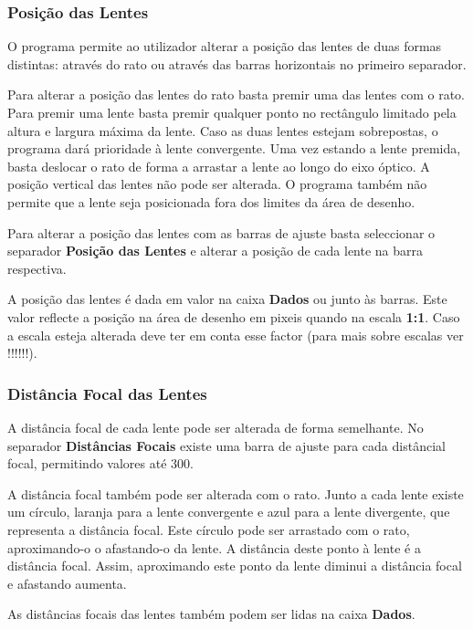 \documentclass[a4paper,12pt]{article}
\begin{document}
\subsubsection{Posição das Lentes}
O programa permite ao utilizador alterar a posição das lentes de duas formas distintas: através do rato ou através das barras horizontais no primeiro separador.
\par
Para alterar a posição das lentes do rato basta premir uma das lentes com o rato. Para premir uma lente basta premir qualquer ponto no rectângulo limitado pela altura e largura máxima da lente. Caso as duas lentes estejam sobrepostas, o programa dará prioridade à lente convergente. Uma vez estando a lente premida, basta deslocar o rato de forma a arrastar a lente ao longo do eixo óptico. A posição vertical das lentes não pode ser alterada. O programa também não permite que a lente seja posicionada fora dos limites da área de desenho.
\par
Para alterar a posição das lentes com as barras de ajuste basta seleccionar o separador {\bf Posição das Lentes} e alterar a posição de cada lente na barra respectiva.
\par 
A posição das lentes é dada em valor na caixa {\bf Dados} ou junto às barras. Este valor reflecte a posição na área de desenho em pixeis quando na escala {\bf 1:1}. Caso a escala esteja alterada deve ter em conta esse factor (para mais sobre escalas ver !!!!!!).

\subsubsection{Distância Focal das Lentes}

A distância focal de cada lente pode ser alterada de forma semelhante. No separador {\bf Distâncias Focais} existe uma barra de ajuste para cada distâncial focal, permitindo valores até 300.
\par
A distância focal também pode ser alterada com o rato. Junto a cada lente existe um círculo, laranja para a lente convergente e azul para a lente divergente, que representa a distância focal. Este círculo pode ser arrastado com o rato, aproximando-o o afastando-o da lente. A distância deste ponto à lente é a distância focal. Assim, aproximando este ponto da lente diminui a distância focal e afastando aumenta.
\par 
As distâncias focais das lentes também podem ser lidas na caixa {\bf Dados}.
\end{document}
